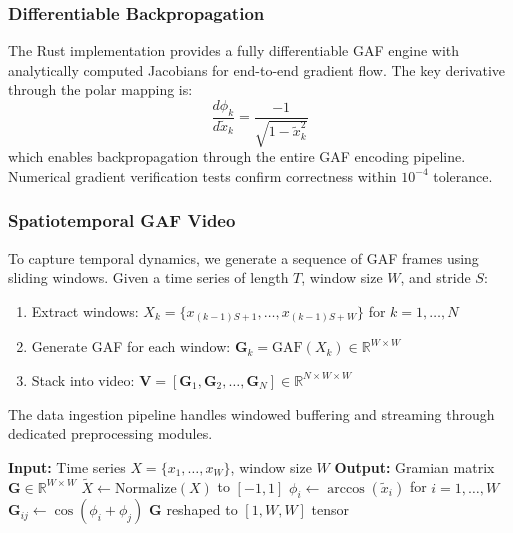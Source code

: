 \documentclass[12pt, a4paper]{article}
\begin{document}
\subsubsection{Differentiable Backpropagation}

The Rust implementation provides a fully differentiable GAF engine with analytically computed Jacobians for end-to-end gradient flow. The key derivative through the polar mapping is:
\begin{equation}
	\frac{d\phi_k}{d\tilde{x}_k} = \frac{-1}{\sqrt{1 - \tilde{x}_k^2}}
\end{equation}
which enables backpropagation through the entire GAF encoding pipeline. Numerical gradient verification tests confirm correctness within $10^{-4}$ tolerance.

\subsubsection{Spatiotemporal GAF Video}
\label{sec:gaf_video}

To capture temporal dynamics, we generate a sequence of GAF frames using sliding windows. Given a time series of length $T$, window size $W$, and stride $S$:
\begin{enumerate}
	\item Extract windows: $X_k = \{x_{(k-1)S+1}, \ldots, x_{(k-1)S+W}\}$ for $k = 1, \ldots, N$
	\item Generate GAF for each window: $\mathbf{G}_k = \text{GAF}(X_k) \in \mathbb{R}^{W \times W}$
	\item Stack into video: $\mathbf{V} = [\mathbf{G}_1, \mathbf{G}_2, \ldots, \mathbf{G}_N] \in \mathbb{R}^{N \times W \times W}$
\end{enumerate}

The data ingestion pipeline handles windowed buffering and streaming through dedicated preprocessing modules.

\begin{algorithm}[htbp]
	\caption{GAF Computation}
	\label{alg:gaf}
	\begin{algorithmic}[1]
		\State \textbf{Input:} Time series $X = \{x_1, \ldots, x_W\}$, window size $W$
		\State \textbf{Output:} Gramian matrix $\mathbf{G} \in \mathbb{R}^{W \times W}$
		\State
		\State $\tilde{X} \leftarrow \text{Normalize}(X)$ to $[-1, 1]$
		\State $\phi_i \leftarrow \arccos(\tilde{x}_i)$ for $i = 1, \ldots, W$
				\State $\mathbf{G}_{ij} \leftarrow \cos(\phi_i + \phi_j)$
			\EndFor
		\EndFor
		\State \Return $\mathbf{G}$ reshaped to $[1, W, W]$ tensor
	\end{algorithmic}
\end{algorithm}
\end{document}
